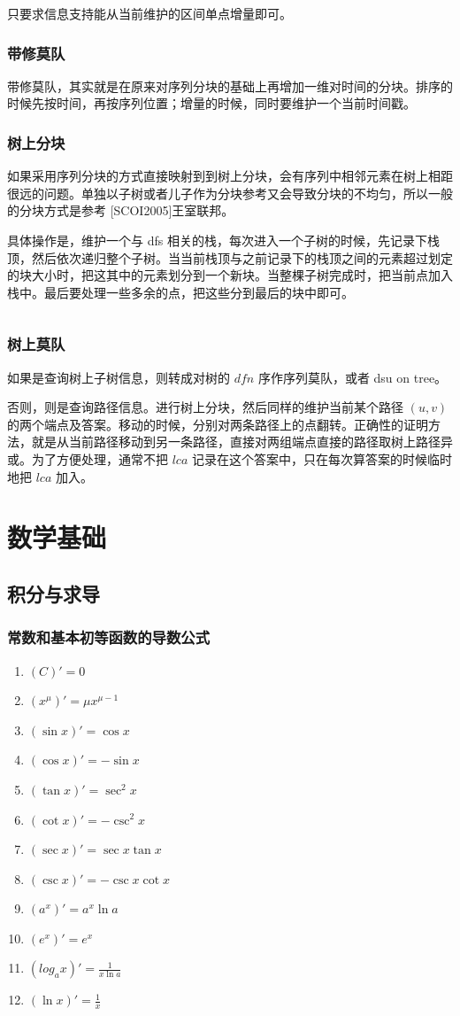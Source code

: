 \documentclass[UTF-8]{ctexart}
\newcommand{\cpp}[1]{\inputminted[bgcolor=bg,breaklines,breakanywhere=true]{c++}{#1}}
\begin{document}
			只要求信息支持能从当前维护的区间单点增量即可。
			\subsubsection{带修莫队}
			带修莫队，其实就是在原来对序列分块的基础上再增加一维对时间的分块。排序的时候先按时间，再按序列位置；增量的时候，同时要维护一个当前时间戳。
			
			\subsubsection{树上分块}
			如果采用序列分块的方式直接映射到到树上分块，会有序列中相邻元素在树上相距很远的问题。单独以子树或者儿子作为分块参考又会导致分块的不均匀，所以一般的分块方式是参考 [SCOI2005]王室联邦。
			
			具体操作是，维护一个与 dfs 相关的栈，每次进入一个子树的时候，先记录下栈顶，然后依次递归整个子树。当当前栈顶与之前记录下的栈顶之间的元素超过划定的块大小时，把这其中的元素划分到一个新块。当整棵子树完成时，把当前点加入栈中。最后要处理一些多余的点，把这些分到最后的块中即可。
			\cpp{code//DataStruct//blocktree.cpp}
			
			\subsubsection{树上莫队}
			如果是查询树上子树信息，则转成对树的 $dfn$ 序作序列莫队，或者 dsu on tree。
			
			否则，则是查询路径信息。进行树上分块，然后同样的维护当前某个路径 $(u,v)$ 的两个端点及答案。移动的时候，分别对两条路径上的点翻转。正确性的证明方法，就是从当前路径移动到另一条路径，直接对两组端点直接的路径取树上路径异或。为了方便处理，通常不把 $lca$ 记录在这个答案中，只在每次算答案的时候临时地把 $lca$ 加入。
	\newpage
	\section{数学基础}
		\subsection{积分与求导}
			\subsubsection{常数和基本初等函数的导数公式}
			\begin{enumerate}
				\item $(C)'=0$
				\item $(x^\mu)'=\mu x^{\mu-1}$
				\item $(\sin x)'=\cos x$
				\item $(\cos x)'=-\sin x$
				\item $(\tan x)'=\sec^2 x$
				\item $(\cot x)'=-\csc^2 x$
				\item $(\sec x)'=\sec x \tan x$
				\item $(\csc x)'=-\csc x\cot x$
				\item $(a^x)'=a^x \ln a$
				\item $(e^x)'=e^x$
				\item $(log _ a x)'=\frac{1}{x \ln a}$
				\item $(\ln x)'=\frac{1}{x}$
			\end{enumerate}
\end{document}
